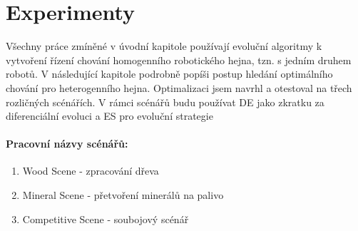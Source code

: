 \chapter{Experimenty}
\label{chap:experimenty}
Všechny práce zmíněné v úvodní kapitole používají evoluční algoritmy k vytvoření řízení chování homogenního robotického hejna, tzn. s jedním druhem robotů. V následující kapitole podrobně popíši postup hledání optimálního chování pro heterogenního hejna. Optimalizaci jsem navrhl a otestoval na třech rozličných scénářích. V rámci scénářů budu používat DE jako zkratku za diferenciální evoluci a ES pro evoluční strategie
\par
\subsubsection{Pracovní názvy scénářů:}
\begin{enumerate}
	\item Wood Scene - zpracování dřeva
	\item Mineral Scene - přetvoření minerálů na palivo 
	\item Competitive Scene - soubojový scénář
\end{enumerate}

